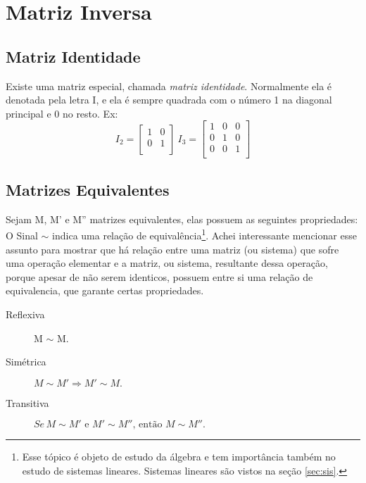 \section{Matriz Inversa}
\subsection{Matriz Identidade}
Existe uma matriz especial, chamada \textit{matriz identidade}. Normalmente ela é denotada pela letra I, e ela é sempre quadrada com o número 1 na diagonal principal e 0 no resto. Ex:
\begin{displaymath}
I_2=
\begin{bmatrix}
1 & 0 \\
0 & 1 \\
\end{bmatrix}
\: I_3=
\begin{bmatrix}
1 & 0 & 0 \\ 0 & 1 & 0 \\ 0 & 0 & 1\\
\end{bmatrix}
\end{displaymath}
\subsection{Matrizes Equivalentes}
 Sejam M, M' e M'' matrizes equivalentes, elas possuem as seguintes propriedades:\\
O Sinal $\sim$ indica uma relação de equivalência\footnote{Esse tópico é objeto de estudo da álgebra e tem importância também no estudo de sistemas lineares. Sistemas lineares são vistos na seção \ref{sec:sis}.}. Achei interessante mencionar esse assunto para mostrar que há relação entre uma matriz (ou sistema) que sofre uma operação elementar e a matriz, ou sistema, resultante dessa operação, porque apesar de não serem identicos, possuem entre si uma relação de equivalencia, que garante certas propriedades.
\begin{description}
  \item[Reflexiva] M $\sim$ M.
  \item[Simétrica] $M\sim M'\Rightarrow M'\sim M.$
  \item[Transitiva]$Se\,  M\sim M'\text{ e }M'\sim M''\text{, então }M\sim M''.$
\end{description}
